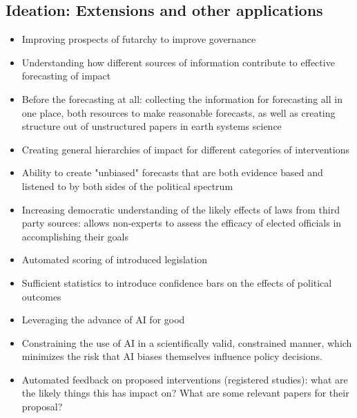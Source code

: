 \documentclass[12pt,a4paper]{article}
\begin{document}
\subsection{Ideation: Extensions and other applications}
\begin{itemize}
    \item Improving prospects of futarchy to improve governance
    \item Understanding how different sources of information contribute to effective forecasting of impact
    \item Before the forecasting at all: collecting the information for forecasting all in one place, both resources to make reasonable forecasts, as well as creating structure out of unstructured papers in earth systems science
    \item Creating general hierarchies of impact for different categories of interventions
    \item Ability to create "unbiased" forecasts that are both evidence based and listened to by both sides of the political spectrum
    \item Increasing democratic understanding of the likely effects of laws from third party sources: allows non-experts to assess the efficacy of elected officials in accomplishing their goals
    \item Automated scoring of introduced legislation 
    \item Sufficient statistics to introduce confidence bars on the effects of political outcomes
    \item Leveraging the advance of AI for good
    \item Constraining the use of AI in a scientifically valid, constrained manner, which minimizes the risk that AI biases themselves influence policy decisions.  
    \item Automated feedback on proposed interventions (registered studies): what are the likely things this has impact on? What are some relevant papers for their proposal?
\end{itemize}
\end{document}
